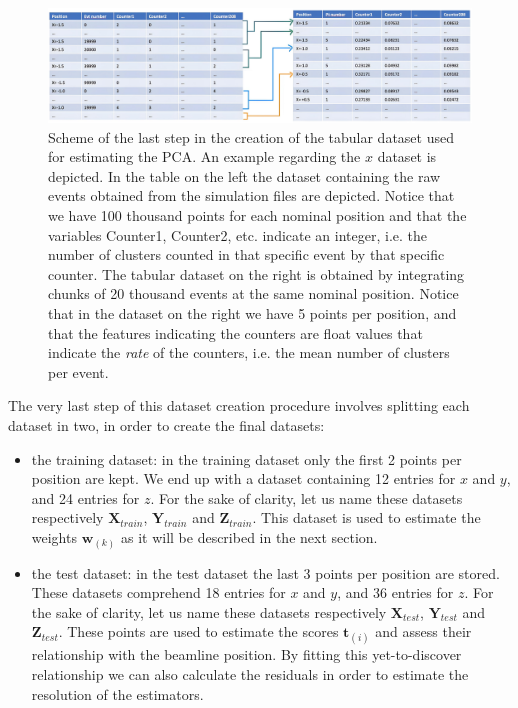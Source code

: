 \begin{figure}
    \centering
    \includegraphics[width=\textwidth]{figures/tabular_dataset.png}
    \caption{Scheme of the last step in the creation of the tabular dataset used for estimating the PCA. An example regarding the $x$ dataset is depicted. In the table on the left the dataset containing the raw events obtained from the simulation files are depicted. Notice that we have 100 thousand points for each nominal position and that the variables Counter1, Counter2, etc. indicate an integer, i.e. the number of clusters counted in that specific event by that specific counter. The tabular dataset on the right is obtained by integrating chunks of 20 thousand events at the same nominal position. Notice that in the dataset on the right we have 5 points per position, and that the features indicating the counters are float values that indicate the \textit{rate} of the counters, i.e. the mean number of clusters per event.}
    \label{fig:tabular_dataset}
\end{figure}

The very last step of this dataset creation procedure involves splitting each dataset in two, in order to create the final datasets: 
\begin{itemize}
    \item the training dataset: in the training dataset only the first 2 points per position are kept. We end up with a dataset containing 12 entries for $x$ and $y$, and 24 entries for $z$. For the sake of clarity, let us name these datasets respectively $\mathbf{X}_{train}$, $\mathbf{Y}_{train}$ and $\mathbf{Z}_{train}$.  This dataset is used to estimate the weights $\mathbf{w}_{(k)}$ as it will be described in the next section.
    \item the test dataset: in the test dataset the last 3 points per position are stored. These datasets comprehend 18 entries for $x$ and $y$, and 36 entries for $z$. For the sake of clarity, let us name these datasets respectively $\mathbf{X}_{test}$, $\mathbf{Y}_{test}$ and $\mathbf{Z}_{test}$. These points are used to estimate the scores $\mathbf{t}_{(i)}$ and assess their relationship with the beamline position. By fitting this yet-to-discover relationship we can also calculate the residuals in order to estimate the resolution of the estimators.
\end{itemize}


